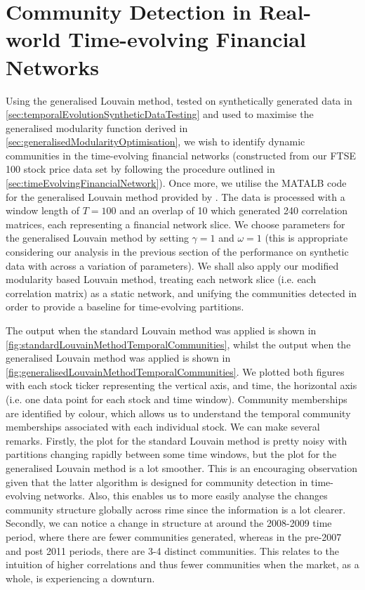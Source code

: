 
\section{Community Detection in Real-world Time-evolving  Financial Networks}
\label{sec:communityDetectionRealWorldTimeEvolvingFinancialNetworks}

Using the generalised Louvain method, tested on synthetically generated data in \cref{sec:temporalEvolutionSyntheticDataTesting} and used to maximise the generalised modularity function derived in \cref{sec:generalisedModularityOptimisation}, we wish to identify dynamic communities in the time-evolving financial networks (constructed from our FTSE 100 stock price data set by following the procedure outlined in \cref{sec:timeEvolvingFinancialNetwork}).
Once more, we utilise the MATALB code for the generalised Louvain method provided by \cite{GenLou}.
The data is processed with a window length of $T = 100$ and an overlap of 10 which generated 240 correlation matrices, each representing a financial network slice.
We choose parameters for the generalised Louvain method by setting $\gamma = 1$ and $\omega = 1$ (this is appropriate considering our analysis in the previous section of the performance on synthetic data with across a variation of parameters).
We shall also apply our modified modularity based Louvain method, treating each network slice (i.e. each correlation matrix) as a static network, and unifying the communities detected in order to provide a baseline for time-evolving partitions.

The output when the standard Louvain method was applied is shown in \cref{fig:standardLouvainMethodTemporalCommunities}, whilst the output when the generalised Louvain method was applied is shown in \cref{fig:generalisedLouvainMethodTemporalCommunities}.
We plotted both figures with each stock ticker representing the vertical axis, and time, the horizontal axis (i.e. one data point for each stock and time window).
Community memberships are identified by colour, which allows us to understand the temporal community memberships associated with each individual stock.
We can make several remarks.
Firstly, the plot for the standard Louvain method is pretty noisy with partitions changing rapidly between some time windows, but the plot for the generalised Louvain method is a lot smoother.
This is an encouraging observation given that the latter algorithm is designed for community detection in time-evolving networks.
Also, this enables us to more easily analyse the changes community structure globally across rime since the information is a lot clearer.
Secondly, we can notice a change in structure at around the 2008-2009 time period, where there are fewer communities generated, whereas in the pre-2007 and post 2011 periods, there are 3-4 distinct communities.
This relates to the intuition of higher correlations and thus fewer communities when the market, as a whole, is experiencing a downturn.

